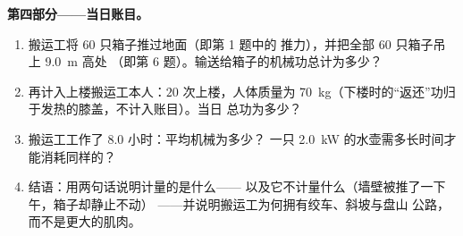 \begin{problem}
\medskip
\noindent\textbf{第四部分——当日账目。}
\begin{enumerate}[resume]
  \item 搬运工将 $60$ 只箱子推过地面（即第 1 题中的
        推力），并把全部 $60$ 只箱子吊上 \qty{9.0}{m} 高处
        （即第 6 题）。输送给箱子的机械功总计为多少？
  \item 再计入上楼搬运工本人：$20$ 次上楼，人体质量为
        \qty{70}{kg}（下楼时的“返还”功归于发热的膝盖，不计入账目）。当日
        总功为多少？
  \item 搬运工工作了 $8.0$ 小时：平均机械为多少？
        一只 \qty{2.0}{kW} 的水壶需多长时间才能消耗同样的？
  \item 结语：用两句话说明计量的是什么——
        以及它不计量什么（墙壁被推了一下午，箱子却静止不动）
——并说明搬运工为何拥有绞车、斜坡与盘山
        公路，而不是更大的肌肉。
\end{enumerate}
\end{problem}
